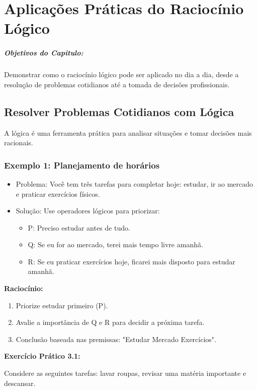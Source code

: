 \documentclass[a4paper,12pt]{book}
\begin{document}
\chapter{Aplicações Práticas do Raciocínio Lógico}

\paragraph{Objetivos do Capitulo:}
Demonstrar como o raciocínio lógico pode ser aplicado no dia a dia, desde a resolução de problemas cotidianos até a tomada de decisões profissionais.

\section{Resolver Problemas Cotidianos com Lógica}
A lógica é uma ferramenta prática para analisar situações e tomar decisões mais racionais.

\subsection*{Exemplo 1: Planejamento de horários}
\begin{itemize}
\item Problema: Você tem três tarefas para completar hoje: estudar, ir ao mercado e praticar exercícios físicos.
\item Solução: Use operadores lógicos para priorizar:
\begin{itemize}
\item P: Preciso estudar antes de tudo.
\item Q: Se eu for ao mercado, terei mais tempo livre amanhã.
\item R: Se eu praticar exercícios hoje, ficarei mais disposto para estudar amanhã.
\end{itemize}
\end{itemize}

\textbf{Raciocínio:}
\begin{enumerate}
\item Priorize estudar primeiro (P).
\item Avalie a importância de Q e R para decidir a próxima tarefa.
\item Conclusão baseada nas premissas: "Estudar  Mercado  Exercícios".
\end{enumerate}

\textbf{Exercício Prático 3.1:}

Considere as seguintes tarefas: lavar roupas, revisar uma matéria importante e descansar.
\end{document}

